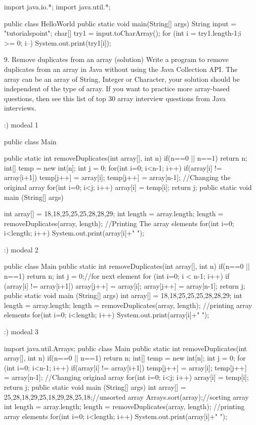 		import java.io.*;
	import java.util.*;

	public class HelloWorld {
   public static void main(String[] args) {
      String input = "tutorialspoint";
      char[] try1 = input.toCharArray();
      for (int i = try1.length-1;i >= 0; i--) System.out.print(try1[i]);
   }
	}
		

9. Remove duplicates from an array (solution)
Write a program to remove duplicates from an array in Java without using the Java Collection API. 
The array can be an array of String, Integer or Character, your solution should be independent of the type of array. 
If you want to practice more array-based questions, then see this list of top 30 array interview questions from Java interviews.

	:) modeal 1
	
		public class Main{
public static int removeDuplicates(int array[], int n){
if(n==0 || n==1){
return n;
}
int[] temp = new int[n];
int j = 0;
for(int i=0; i<n-1; i++){
if(array[i] != array[i+1]){
temp[j++] = array[i];
}
}
temp[j++] = array[n-1];
//Changing the original array
for(int i=0; i<j; i++){
array[i] = temp[i];
}
return j;
}
public static void main (String[] args) {
int array[] = {18,18,25,25,25,28,28,29};
int length = array.length;
length = removeDuplicates(array, length);
//Printing The array elements
for(int i=0; i<length; i++)
System.out.print(array[i]+" ");
 
}
 
}

		
	
	:) modeal 2
	
	public class Main{
public static int removeDuplicates(int array[], int n){
if(n==0 || n==1){
return n;
}
int j = 0;//for next element
for (int i=0; i < n-1; i++){
if (array[i] != array[i+1]){
array[j++] = array[i];
}
}
array[j++] = array[n-1];
return j;
}
public static void main (String[] args) {
int array[] = {18,18,25,25,25,28,28,29};
int length = array.length;
length = removeDuplicates(array, length);
//printing array elements
for(int i=0; i<length; i++)
System.out.print(array[i]+" ");
}
}
	
	:) modeal 3
	
	import java.util.Arrays;
public class Main{
public static int removeDuplicates(int array[], int n){
if(n==0 || n==1){
return n;
}
int[] temp = new int[n];
int j = 0;
for (int i=0; i<n-1; i++){
if(array[i] != array[i+1]){
temp[j++] = array[i];
}
}
temp[j++] = array[n-1];
//Changing original array
for(int i=0; i<j; i++){
array[i] = temp[i];
}
return j;
}
public static void main (String[] args) {
int array[] = {25,28,18,29,25,18,29,28,25,18};//unsorted array
Arrays.sort(array);//sorting array
int length = array.length;
length = removeDuplicates(array, length);
//printing array elements
for(int i=0; i<length; i++)
System.out.print(array[i]+" ");
}
}
	



